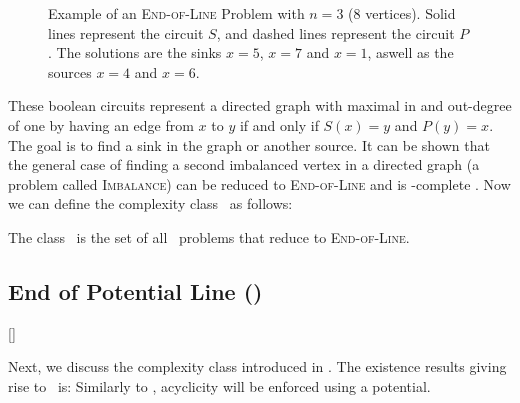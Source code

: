
\begin{figure}[ht]
	\centering
	\caption[Example of an \textsc{End-of-Line} Problem]{Example of an \textsc{End-of-Line} Problem with $n=3$ (8 vertices).
		Solid lines represent the circuit $S$, and dashed lines represent the circuit $P$.
		The solutions are the sinks $x=5$, $x=7$ and $x=1$, aswell as the sources $x=4$ and $x=6$.}
	\label{fig:ppad_example}
\end{figure}

These boolean circuits represent a directed graph with maximal in and out-degree of one by having an edge from $x$ to $y$ if and only if $S(x) = y$ and $P(y) =
	x$.
The goal is to find a sink in the graph or another source.
It can be shown that the general case of finding a second imbalanced vertex in a directed graph (a problem called \textsc{Imbalance}) can be reduced to
\textsc{End-of-Line} and is \PPAD-complete .
Now we can define the complexity class \PPAD\ as follows:

\begin{definition}[\PPAD]
	The class \PPAD\ is the set of all \TFNP\ problems that reduce to \textsc{End-of-Line}.
\end{definition}

\subsection{End of Potential Line (\EOPL)}[\EOPL]

Next, we discuss the complexity class \EOPL{} introduced in . The existence results giving rise to \EOPL\ is:
Similarly to \PLS, acyclicity will be enforced using a potential.

